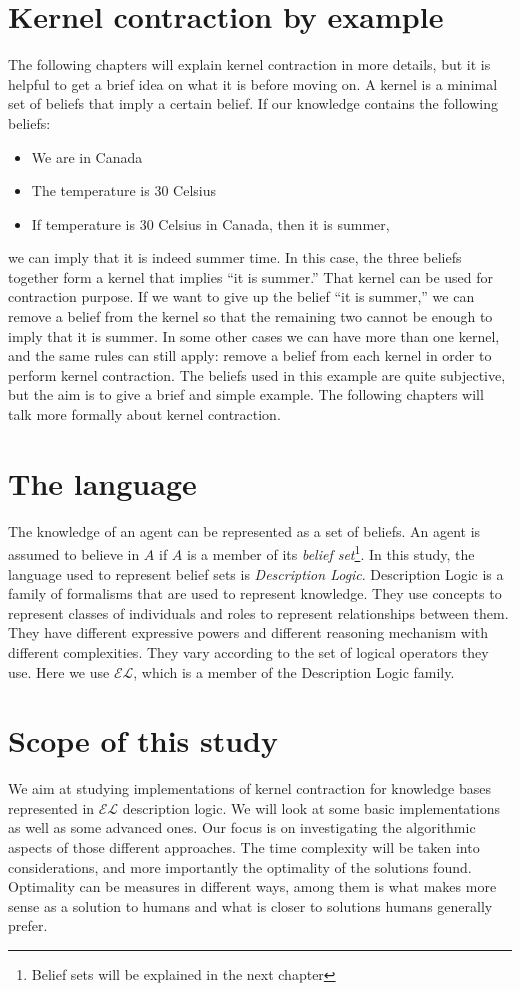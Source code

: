 \section{Kernel contraction by example}
The following chapters will explain kernel contraction in more details, but it is helpful to get a brief idea on what it is before moving on. A kernel is a minimal set of beliefs that imply a certain belief. If our knowledge contains the following beliefs:
\begin{itemize}
\item We are in Canada
\item The temperature is 30 Celsius
\item If temperature is 30 Celsius in Canada, then it is summer,
\end{itemize}
we can imply that it is indeed summer time. In this case, the three beliefs together form a kernel that implies ``it is summer.'' That kernel can be used for contraction purpose. If we want to give up the belief ``it is summer,'' we can remove a belief from the kernel so that the remaining two cannot be enough to imply that it is summer. In some other cases we can have more than one kernel, and the same rules can still apply: remove a belief from each kernel in order to perform kernel contraction. The beliefs used in this example are quite subjective, but the aim is to give a brief and simple example. The following chapters will talk more formally about kernel contraction.

\section{The language}
The knowledge of an agent can be represented as a set of beliefs. An agent is assumed to believe in $A$ if $A$ is a member of its \textit{belief set}\footnote{Belief sets will be explained in the next chapter}. In this study, the language used to represent belief sets is \textit{Description Logic}. Description Logic is a family of formalisms that are used to represent knowledge. They use concepts to represent classes of individuals and roles to represent relationships between them. They have different expressive powers and different reasoning mechanism with different complexities. They vary according to the set of logical operators they use. Here we use $\mathcal{EL}$, which is a member of the Description Logic family.

\section{Scope of this study}
We aim at studying implementations of kernel contraction for knowledge bases represented in $\mathcal{EL}$ description logic. We will look at some basic implementations as well as some advanced ones. Our focus is on investigating the algorithmic aspects of those different approaches. The time complexity will be taken into considerations, and more importantly the optimality of the solutions found. Optimality can be measures in different ways, among them is what makes more sense as a solution to humans and what is closer to solutions humans generally prefer.

